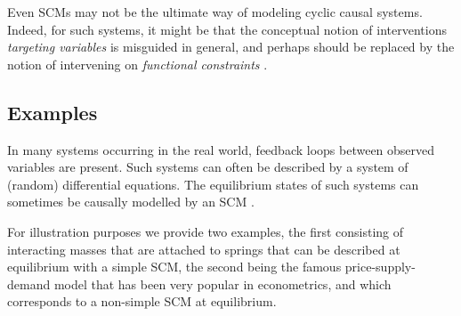 Even SCMs may not be the ultimate way of modeling cyclic causal systems. Indeed, for such
systems, it might be that the conceptual notion of interventions \emph{targeting variables} is misguided in general, 
and perhaps should be replaced by the notion of intervening on \emph{functional constraints} \cite{BlomVanDiepenMooij_JMLR_21}.

\subsection{Examples}\label{sec:scm_examples}

In many systems occurring in the real world, feedback loops between observed variables are present. 
Such systems can often be described by a system of (random) differential equations. 
The equilibrium states of such systems can sometimes be causally modelled by an SCM \cite{BM18}.

For illustration purposes we provide two examples, the first consisting of interacting masses that are attached to springs
that can be described at equilibrium with a simple SCM, the second being the famous price-supply-demand model that has been
very popular in econometrics, and which corresponds to a non-simple SCM at equilibrium.

